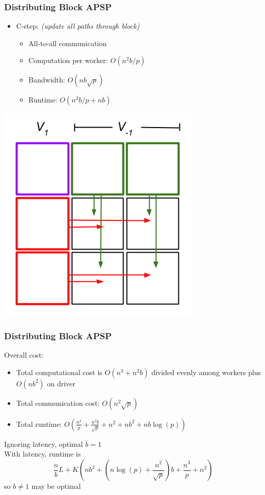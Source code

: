 \documentclass{beamer}
\begin{document}
\begin{frame}
\frametitle{Distributing Block APSP}
\begin{itemize}
\item C-step: \emph{(update all paths through block)}
\begin{itemize}
\item All-to-all communication
\item Computation per worker: $O(n^2b/p)$
\item Bandwidth: $O(nb\sqrt{p})$
\item Runtime: $O(n^2b/p  + nb)$
\end{itemize}
\end{itemize}
\begin{center}
\includegraphics[scale = 0.3]{blockApsp-4.png}
\end{center}

\end{frame}

\begin{frame}
\frametitle{Distributing Block APSP}
Overall cost:
\begin{itemize}
\item Total computational cost is $O(n^3 + n^2b)$ divided evenly among workers plus $O(nb^2)$ on driver
\item Total communication cost: $O(n^2\sqrt{p})$
\item Total runtime: $O(\frac{n^3}{p} + \frac{n^2 b}{\sqrt{p}} +  n^2 + nb^2 + nb\log(p))$
\end{itemize}
Ignoring latency, optimal $b= 1$\\

With latency, runtime is
\[
\frac{n}{b}L + K\left(nb^2+ \left(n\log(p) + \frac{n^2}{\sqrt{p}}\right)b +\frac{n^3}{p}  +  n^2 \right)
\]
so $b \neq 1$ may be optimal
\end{frame}
\end{document}
